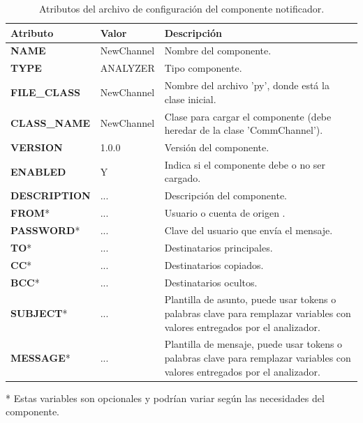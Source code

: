             \begin{table}[ht!]
            \caption[Archivo de configuración del componente notificador]{Atributos del archivo de configuración del componente notificador.}
            \label{Tab:ConfigFileChannel}
            \centering
            \begin{tabular}{ | l l p{7cm} | } 
                \hline
                \textbf{Atributo}       & \textbf{Valor} & \textbf{Descripción} \\ 
                \hline\hline
                \textbf{NAME}           & NewChannel & Nombre del componente.\\
                \hline
                \textbf{TYPE}           & ANALYZER    & Tipo componente.\\
                \hline
                \textbf{FILE\_CLASS}    & NewChannel & Nombre del archivo 'py', donde está la clase inicial.\\
                \hline
                \textbf{CLASS\_NAME}    & NewChannel & Clase para cargar el componente (debe heredar de la clase 'CommChannel').\\
                \hline
                \textbf{VERSION}        & 1.0.0         &  Versión del componente.\\
                \hline
                \textbf{ENABLED}        & Y             & Indica si el componente debe o no ser cargado.\\
                \hline
                \textbf{DESCRIPTION}    & ...           &  Descripción del componente.\\
                \hline
                \textbf{FROM}*      & ...  & Usuario o cuenta de origen .\\
                \hline
                \textbf{PASSWORD}*  & ...  & Clave del usuario que envía el mensaje.\\
                \hline
                \textbf{TO}*        & ...  & Destinatarios principales.\\
                \hline
                \textbf{CC}*        & ...  & Destinatarios copiados.\\
                \hline
                \textbf{BCC}*       & ...  & Destinatarios ocultos.\\
                \hline
                \textbf{SUBJECT}*   & ...  & Plantilla de asunto, puede usar tokens o palabras clave para remplazar variables con valores entregados por el analizador.\\
                \hline
                \textbf{MESSAGE}*   & ...  & Plantilla de mensaje, puede usar tokens o palabras clave para remplazar variables con valores entregados por el analizador.\\
                \hline
            \end{tabular}
            \newline
            * Estas variables son opcionales y podrían variar según las necesidades del componente.
            \end{table}

